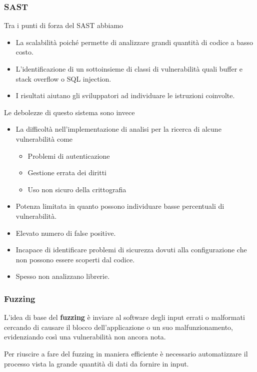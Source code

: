 \subsubsection{SAST}
Tra i punti di forza del SAST abbiamo
\begin{itemize}
	\item La scalabilità poiché permette di analizzare grandi quantità di codice a basso costo.
	\item L'identificazione di un sottoinsieme di classi di vulnerabilità quali buffer e stack overflow o SQL
	      injection.
	\item I risultati aiutano gli sviluppatori ad individuare le istruzioni coinvolte.
\end{itemize}
Le debolezze di questo sistema sono invece
\begin{itemize}
	\item La difficoltà nell'implementazione di analisi per la ricerca di alcune vulnerabilità come
	      \begin{itemize}
		      \item Problemi di autenticazione
		      \item Gestione errata dei diritti
		      \item Uso non sicuro della crittografia
	      \end{itemize}
	\item Potenza limitata in quanto possono individuare basse percentuali di vulnerabilità.
	\item Elevato numero di false positive.
	\item Incapace di identificare problemi di sicurezza dovuti alla configurazione che non possono essere scoperti
	      dal codice.
	\item Spesso non analizzano librerie.
\end{itemize}

\subsubsection{Fuzzing}
L'idea di base del \textbf{fuzzing} è inviare al software degli input errati o malformati cercando di causare il blocco
dell'applicazione o un suo malfunzionamento, evidenziando così una vulnerabilità non ancora nota.

Per riuscire a fare del fuzzing in maniera efficiente è necessario automatizzare il processo vista la grande quantità
di dati da fornire in input.

